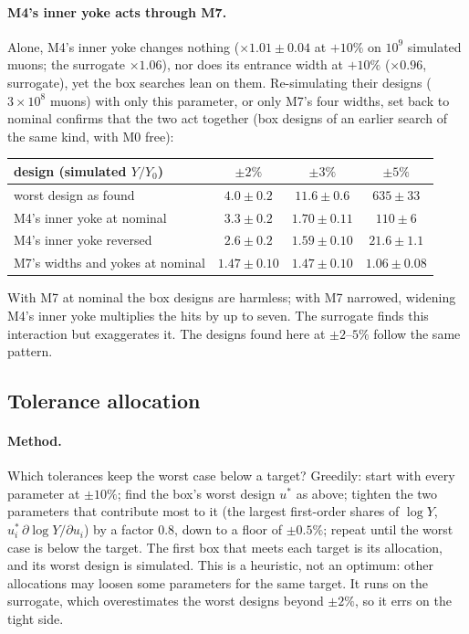 \documentclass[11pt,a4paper]{article}
\newcommand{\HH}{Y/Y_0}
\begin{document}
\paragraph{M4's inner yoke acts through M7.}
Alone, M4's inner yoke changes nothing ($\times1.01\pm0.04$ at $+10\%$ on $10^9$ simulated muons;
the surrogate $\times1.06$), nor does its entrance width at $+10\%$ ($\times0.96$, surrogate), yet the box searches lean on them. Re-simulating their designs ($3\times10^8$
muons) with only this parameter, or only M7's four widths, set back to nominal confirms that the
two act together (box designs of an earlier search of the same kind, with M0 free):
\begin{center}
\small
\begin{tabular}{lccc}
\toprule
design (simulated $\HH$) & $\pm2\%$ & $\pm3\%$ & $\pm5\%$ \\
\midrule
worst design as found            & $4.0\pm0.2$ & $11.6\pm0.6$ & $635\pm33$ \\
M4's inner yoke at nominal       & $3.3\pm0.2$ & $1.70\pm0.11$ & $110\pm6$ \\
M4's inner yoke reversed         & $2.6\pm0.2$ & $1.59\pm0.10$ & $21.6\pm1.1$ \\
M7's widths and yokes at nominal & $1.47\pm0.10$ & $1.47\pm0.10$ & $1.06\pm0.08$ \\
\bottomrule
\end{tabular}
\end{center}
With M7 at nominal the box designs are harmless; with M7 narrowed, widening M4's inner yoke
multiplies the hits by up to seven. The surrogate finds this interaction but exaggerates it. The
designs found here at $\pm2$--$5\%$ follow the same pattern.

\subsection{Tolerance allocation}
\label{sec:allocation}

\paragraph{Method.} Which tolerances keep the worst case below a target? Greedily: start with
every parameter at $\pm10\%$; find the box's worst design $u^*$ as above; tighten the two
parameters that contribute most to it (the largest first-order shares of $\log Y$,
$u^*_i\,\partial\log Y/\partial u_i$) by a factor $0.8$, down to a floor of $\pm0.5\%$; repeat
until the worst case is below the target. The first box that meets each target is its
allocation, and its worst design is simulated. This is a heuristic, not an optimum: other
allocations may loosen some parameters for the same target. It runs on the surrogate, which
overestimates the worst designs beyond $\pm2\%$, so it errs on the tight side.
\end{document}
